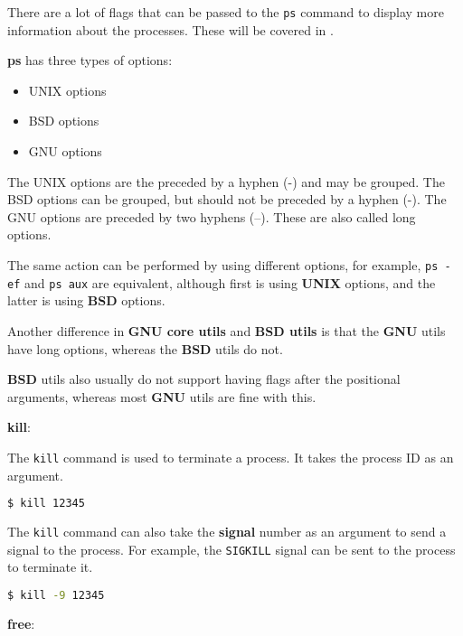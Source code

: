 There are a lot of flags that can be passed to the \lstinline|ps| command to display more information about the processes. These will be covered in .

\begin{remark}
  \textbf{ps} has three types of options:
  \begin{itemize}
    \item UNIX options
    \item BSD options
    \item GNU options
  \end{itemize}
  The UNIX options are the preceded by a hyphen (-{}) and may be grouped.
  The BSD options can be grouped, but should not be preceded by a hyphen (-{}).
  The GNU options are preceded by two hyphens (--).
  These are also called long options.

  The same action can be performed by using different options, for example, \lstinline|ps -ef| and \lstinline|ps aux| are equivalent, although first is using \textbf{UNIX} options, and the latter is using \textbf{BSD} options.

  Another difference in \textbf{GNU core utils} and \textbf{BSD utils} is that the \textbf{GNU} utils have long options, whereas the \textbf{BSD} utils do not.

  \textbf{BSD} utils also usually do not support having flags after the positional arguments, whereas most \textbf{GNU} utils are fine with this.
\end{remark}


\textbf{kill}:

The \lstinline|kill| command is used to terminate a process.
It takes the process ID as an argument.

\begin{lstlisting}[language=bash]
  $ kill 12345
\end{lstlisting}

The \lstinline|kill| command can also take the \textbf{signal} number as an argument to send a signal to the process.
For example, the \lstinline|SIGKILL| signal can be sent to the process to terminate it.

\begin{lstlisting}[language=bash]
  $ kill -9 12345
\end{lstlisting}

\textbf{free}:

